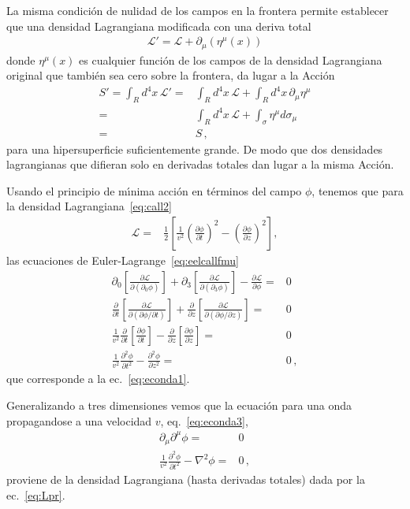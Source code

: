 La misma condición de nulidad de los campos en la frontera permite establecer que una densidad Lagrangiana modificada con una deriva total
\begin{align}
  \mathcal{L}'=\mathcal{L}+\partial_\mu(\eta^{\mu}(x))
\end{align}
donde $\eta^{\mu}(x)$ es cualquier función de los campos de la densidad Lagrangiana original que también sea cero sobre la frontera, da lugar a la Acci\'on
\begin{align}
  S'=\int_{R}d^4x\,\mathcal{L}'=&\int_{R}d^4x\,\mathcal{L}+\int_R d^4x\,\partial_\mu\eta^{\mu}\nonumber\\
  =&\int_{R}d^4x\,\mathcal{L}+\int_\sigma \eta^{\mu} d\sigma_{\mu}\nonumber\\
  =&S\,,
\end{align}
para una hipersuperficie suficientemente grande. De modo que dos densidades lagrangianas que difieran solo en derivadas totales dan lugar a la misma Acci\'on.

Usando el principio de m\'\i nima acci\'on en t\'erminos del campo $\phi$, tenemos que para la densidad Lagrangiana~\eqref{eq:call2}
\begin{align}
  \mathcal{L}=&\frac{1}{2}  \left[
  \frac{1}{v^2}\left(\frac{\partial\phi}{\partial t}\right)^2-\left(\frac{\partial\phi}{\partial z}\right)^2
\right],
\end{align}
las ecuaciones de Euler-Lagrange~\eqref{eq:eelcallfmu}
\begin{align}
  \partial_0\left[\frac{\partial\mathcal{L}}{\partial(\partial_0\phi)}\right]+
\partial_3\left[\frac{\partial\mathcal{L}}{\partial(\partial_3\phi)}\right]
-\frac{\partial\mathcal{L}}{\partial\phi}=&0\nonumber\\
  \frac{\partial}{\partial t}\left[\frac{\partial\mathcal{L}}{\partial(\partial\phi/\partial t)}\right]+
\frac{\partial}{\partial z}\left[\frac{\partial\mathcal{L}}{\partial(\partial\phi/\partial z)}\right]
=&0\nonumber\\
 \frac{1}{v^2}\frac{\partial}{\partial t}\left[\frac{\partial\phi}{\partial t}\right]
-\frac{\partial}{\partial z}\left[\frac{\partial\phi}{\partial z}\right]=&0\nonumber\\
 \frac{1}{v^2}\frac{\partial^2\phi}{\partial t^2}-\frac{\partial^2\phi}{\partial z^2}=&0\,,
\end{align}
que corresponde a la ec.~\eqref{eq:econda1}.

Generalizando a tres dimensiones vemos que la ecuaci\'on para una onda propagandose a una velocidad $v$, eq.~\eqref{eq:econda3},  
\begin{align}
     \partial_{\mu}\partial^{\mu}\phi=&0 \nonumber\\
     \frac{1}{v^2}\frac{\partial^2\phi}{\partial t^2}-\nabla^2\phi=&0\,,
\end{align}
proviene de la densidad Lagrangiana (hasta derivadas totales) dada por la ec.~\eqref{eq:Lpr}.

